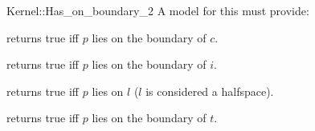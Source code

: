 \begin{ccRefFunctionObjectConcept}{Kernel::Has_on_boundary_2}
A model for this must provide:


{returns true iff $p$ lies on the boundary of $c$.}

{returns true iff $p$ lies on the boundary of $i$.}

{returns true iff $p$ lies on $l$ ($l$ is considered a halfspace).}

{returns true iff $p$ lies on the boundary of $t$.}

\end{ccRefFunctionObjectConcept}
